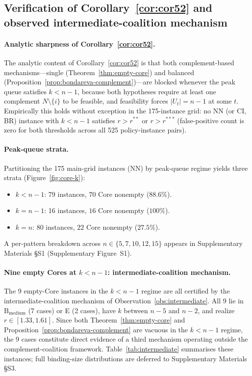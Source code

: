 \documentclass[11pt]{article}
\theoremstyle{plain}
\theoremstyle{definition}
\theoremstyle{remark}
\begin{document}
\subsection{Verification of Corollary~\ref{cor:cor52} and observed intermediate-coalition mechanism}
\label{ssec:cor16}

\paragraph{Analytic sharpness of Corollary~\ref{cor:cor52}.} The analytic content of Corollary~\ref{cor:cor52} is that both complement-based mechanisms---single (Theorem~\ref{thm:empty-core}) and balanced (Proposition~\ref{prop:bondareva-complement})---are blocked whenever the peak queue satisfies $k<n-1$, because both hypotheses require at least one complement $N\setminus\{i\}$ to be feasible, and feasibility forces $|U_t|=n-1$ at some $t$. Empirically this holds without exception in the 175-instance grid: no NN (or CI, BR) instance with $k<n-1$ satisfies $r>r^{\ast\ast}$ or $r>r^{\ast\ast\ast}$ (false-positive count is zero for both thresholds across all 525 policy-instance pairs).

\paragraph{Peak-queue strata.} Partitioning the 175 main-grid instances (NN) by peak-queue regime yields three strata (Figure~\ref{fig:core-k}):
\begin{itemize}
  \item $k<n-1$: 79 instances, $70$ Core nonempty ($88.6\%$).
  \item $k=n-1$: 16 instances, $16$ Core nonempty ($100\%$).
  \item $k=n$:   80 instances, $22$ Core nonempty ($27.5\%$).
\end{itemize}
A per-pattern breakdown across $n\in\{5,7,10,12,15\}$ appears in Supplementary Materials \S S1 (Supplementary Figure~S1).

\paragraph{Nine empty Cores at $k<n-1$: intermediate-coalition mechanism.} The 9 empty-Core instances in the $k<n-1$ regime are all certified by the intermediate-coalition mechanism of Observation~\ref{obs:intermediate}. All 9 lie in $\text{B}_{\text{medium}}$ (7 cases) or E (2 cases), have $k$ between $n-5$ and $n-2$, and realize $r\in[1.33,1.61]$. Since both Theorem~\ref{thm:empty-core} and Proposition~\ref{prop:bondareva-complement} are vacuous in the $k<n-1$ regime, the 9 cases constitute direct evidence of a third mechanism operating outside the complement-coalition framework. Table~\ref{tab:intermediate} summarises these instances; full binding-size distributions are deferred to Supplementary Materials \S S3.
\end{document}
